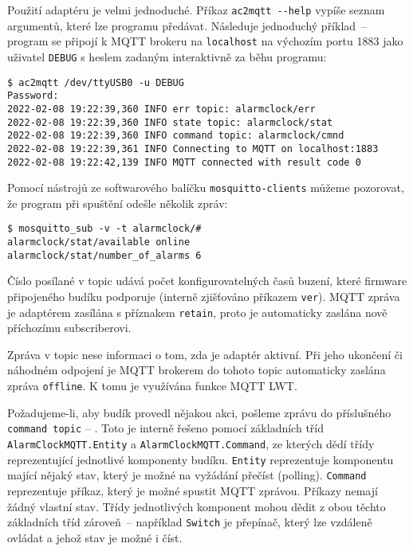 Použití adaptéru je velmi jednoduché. Příkaz \verb|ac2mqtt --help|
vypíše seznam argumentů, které lze programu předávat.
Následuje jednoduchý příklad~-- program se připojí k MQTT brokeru na
\texttt{localhost} na výchozím portu 1883 jako uživatel \texttt{DEBUG} s heslem
zadaným interaktivně za běhu programu:
\begin{lstlisting}[style=terminal]
$ ac2mqtt /dev/ttyUSB0 -u DEBUG
Password:
2022-02-08 19:22:39,360 INFO err topic: alarmclock/err
2022-02-08 19:22:39,360 INFO state topic: alarmclock/stat
2022-02-08 19:22:39,360 INFO command topic: alarmclock/cmnd
2022-02-08 19:22:39,361 INFO Connecting to MQTT on localhost:1883
2022-02-08 19:22:42,139 INFO MQTT connected with result code 0

\end{lstlisting}

Pomocí nástrojů ze softwarového balíčku \texttt{mosquitto-clients}
můžeme pozorovat, že program při spuštění odešle několik zpráv:
\begin{lstlisting}[style=terminal]
$ mosquitto_sub -v -t alarmclock/#
alarmclock/stat/available online
alarmclock/stat/number_of_alarms 6
\end{lstlisting}
Číslo posílané v topic  udává počet
konfigurovatelných časů buzení, které firmware připojeného budíku podporuje
(interně zjišťováno příkazem \texttt{ver}). MQTT zpráva je adaptérem zasílána
s příznakem \texttt{retain}, proto je automaticky zaslána nově příchozímu
subscriberovi.

Zpráva v topic  nese informaci o tom, zda je
adaptér aktivní. Při jeho ukončení či náhodném odpojení je MQTT brokerem do
tohoto topic automaticky zaslána zpráva \texttt{offline}. K tomu je využívána
funkce MQTT \ac{LWT}.

Požadujeme-li, aby budík provedl nějakou akci, pošleme zprávu do příslušného
\texttt{command topic} -- .
Toto je interně řešeno pomocí základních tříd \texttt{AlarmClockMQTT.Entity}
a \texttt{AlarmClockMQTT.Command}, ze kterých dědí třídy reprezentující
jednotlivé komponenty budíku. \texttt{Entity} reprezentuje komponentu mající
nějaký stav, který je možné na vyžádání přečíst
(\foreignlanguage{english}{polling}). \texttt{Command} reprezentuje příkaz,
který je možné spustit MQTT zprávou. Příkazy nemají žádný vlastní stav.
Třídy jednotlivých komponent mohou dědit z obou těchto základních tříd
zároveň~-- například \texttt{Switch} je přepínač, který lze vzdáleně ovládat
a jehož stav je možné i číst.

